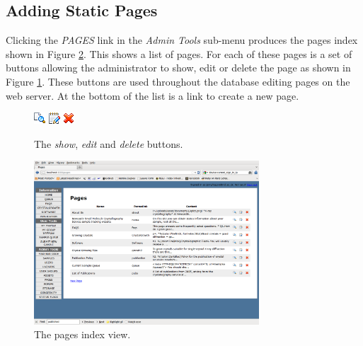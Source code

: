 \documentclass[12pt]{article}
\begin{document}
\subsection{Adding Static Pages}\label{sec:static}
Clicking the \emph{PAGES} link in the \emph{Admin Tools} sub-menu 
produces the pages index shown in Figure \ref{fig:pageidx}.
This shows a list of pages. For each of these pages is a set of buttons
allowing the administrator to show, edit or delete the page as shown in
Figure \ref{fig:showeditdelete}.
These buttons are used throughout the database editing pages on the web server.
At the bottom of the list is a link to create a new page.

\begin{figure}[!h]
\begin{center}
\includegraphics{show}\quad
\includegraphics{edit}\quad
\includegraphics{delete}
\end{center}
\caption{The \emph{show}, \emph{edit} and \emph{delete} buttons.
\label{fig:showeditdelete}}
\end{figure}

\begin{figure}[!h]
\begin{center}
\includegraphics[width=0.75\textwidth]{pageidx}
\caption{The pages index view.\label{fig:pageidx}}
\end{center}
\end{figure}
\end{document}
